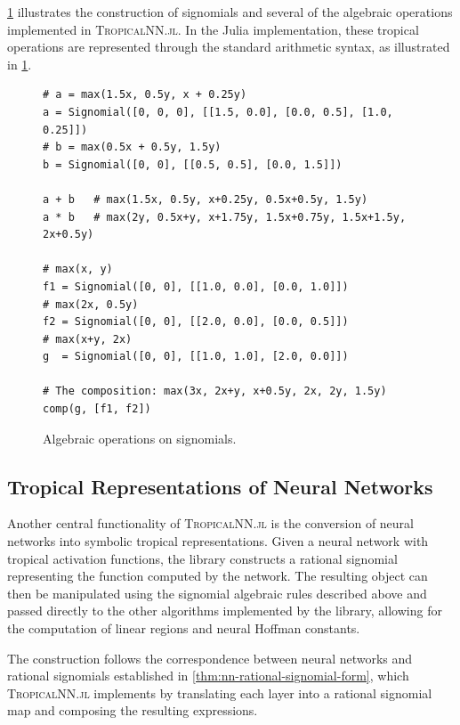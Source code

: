\documentclass[10pt]{article}
\theoremstyle{definition}
\theoremstyle{remark}
\begin{document}
\cref{fig:signomial-setup} illustrates the construction of signomials
and several of the algebraic operations implemented in
\textsc{TropicalNN.jl}. In the Julia implementation, these tropical operations are represented through the standard arithmetic syntax, as illustrated in \cref{fig:signomial-setup}.

\begin{figure}[H]
\begin{lstlisting}
# a = max(1.5x, 0.5y, x + 0.25y)
a = Signomial([0, 0, 0], [[1.5, 0.0], [0.0, 0.5], [1.0, 0.25]])
# b = max(0.5x + 0.5y, 1.5y)
b = Signomial([0, 0], [[0.5, 0.5], [0.0, 1.5]])

a + b   # max(1.5x, 0.5y, x+0.25y, 0.5x+0.5y, 1.5y)
a * b   # max(2y, 0.5x+y, x+1.75y, 1.5x+0.75y, 1.5x+1.5y, 2x+0.5y)

# max(x, y)
f1 = Signomial([0, 0], [[1.0, 0.0], [0.0, 1.0]])
# max(2x, 0.5y)
f2 = Signomial([0, 0], [[2.0, 0.0], [0.0, 0.5]])
# max(x+y, 2x)
g  = Signomial([0, 0], [[1.0, 1.0], [2.0, 0.0]])

# The composition: max(3x, 2x+y, x+0.5y, 2x, 2y, 1.5y)
comp(g, [f1, f2])
\end{lstlisting}
\caption{Algebraic operations on signomials.}
\label{fig:signomial-setup}
\end{figure}

\subsection{Tropical Representations of Neural Networks}

Another central functionality of \textsc{TropicalNN.jl} is the conversion of neural networks into symbolic tropical representations. Given a neural network with tropical activation functions, the library constructs a rational signomial representing the function computed by the network. The resulting object can then be manipulated using the signomial algebraic rules described above and passed directly to the other algorithms implemented by the library, allowing for the computation of linear regions and neural Hoffman constants.

The construction follows the correspondence between neural networks and rational signomials established in \cref{thm:nn-rational-signomial-form}, which \textsc{TropicalNN.jl} implements by translating each layer into a rational signomial map and composing the resulting expressions.
\end{document}
